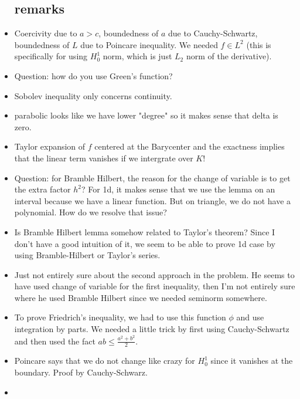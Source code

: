 \documentclass{article}
\theoremstyle{remark}
\begin{document}
\begin{itemize}
\subsection*{remarks}
\item Coercivity due to $a>c$, boundedness of $a$ due to Cauchy-Schwartz, boundedness of $L$ due to Poincare inequality. We needed $f\in L^2$ (this is specifically for using $H_0^1$ norm, which is just $L_2$ norm of the derivative).
\item Question: how do you use Green's function?
\item Sobolev inequality only concerns continuity.
\item parabolic looks like we have lower "degree" so it makes sense that delta is zero.
\item Taylor expansion of $f$ centered at the Barycenter and the exactness implies that the linear term vanishes if we intergrate over $K$!
\item Question: for Bramble Hilbert, the reason for the change of variable is to get the extra factor $h^2$? For 1d, it makes sense that we use the lemma on an interval because we have a linear function. But on triangle, we do not have a polynomial. How do we resolve that issue?
\item Is Bramble Hilbert lemma somehow related to Taylor's theorem? Since I don't have a good intuition of it, we seem to be able to prove 1d case by using Bramble-Hilbert or Taylor's series.
\item Just not entirely sure about the second approach in the problem. He seems to have used change of variable for the first inequality, then I'm not entirely sure where he used Bramble Hilbert since we needed seminorm somewhere.
\item To prove Friedrich's inequality, we had to use this function $\phi$ and use integration by parts. We needed a little trick by first using Cauchy-Schwartz and then used the fact $ab\leq\frac{a^2+b^2}{2}$.
\item Poincare says that we do not change like crazy for $H^1_0$ since it vanishes at the boundary. Proof by Cauchy-Schwarz.
\item
    \end{itemize}
\end{document}
